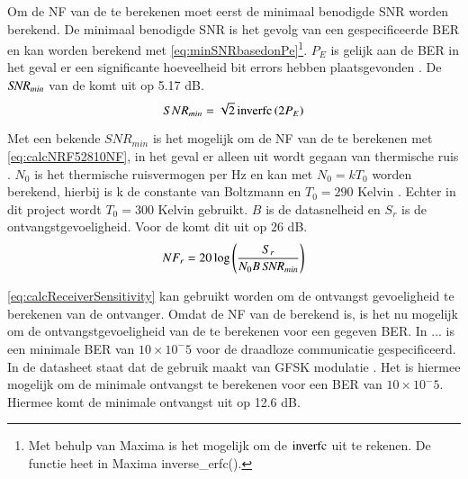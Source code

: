 Om de NF van de \mcu te berekenen moet eerst de minimaal benodigde SNR worden berekend. De minimaal benodigde SNR is het gevolg van een gespecificeerde BER en kan worden berekend met \autoref{eq:minSNRbasedonPe}\footnote{Met behulp van Maxima is het mogelijk om de $\operatorname{inverfc}$  uit te rekenen. De functie heet in Maxima inverse\_erfc().}. $P_E$ is gelijk aan de BER in het geval er een significante hoeveelheid bit errors hebben plaatsgevonden \cite{BERtoPe}. De $\mbox{\textit{SNR}}_{min}$ van de \mcu komt uit op 5.17 dB. 
\begin{equation}\label{eq:minSNRbasedonPe}
    SNR_{min}=\sqrt{2}\inverfc\left(2P_E\right)
    \tagaddtext{[\si{\decibel}]}
\end{equation}

Met een bekende $SNR_{min}$ is het mogelijk om de NF van de \mcu te berekenen met \autoref{eq:calcNRF52810NF}, in het geval er alleen uit wordt gegaan van thermische ruis \cite{SWRA030}. $N_0$ is het thermische ruisvermogen per Hz en kan met $N_0=kT_0$ worden berekend, hierbij is k de constante van Boltzmann en $T_0=290$ Kelvin \cite{Short-rangeWirelessCommunication}. Echter in dit project wordt $T_0=300$ Kelvin gebruikt. $B$ is de datasnelheid en $S_r$ is de ontvangstgevoeligheid. Voor de \mcu komt dit uit op 26 dB.
\begin{equation}\label{eq:calcNRF52810NF}
    NF_r=20\log\left(\frac{S_{r}}{N_0B\,\SNR_{min}}\right)
    \tagaddtext{[\si{\decibel}]}
\end{equation}

\autoref{eq:calcReceiverSensitivity} kan gebruikt worden om de ontvangst gevoeligheid te berekenen van de ontvanger. Omdat de NF van de \mcu berekend is, is het nu mogelijk om de ontvangstgevoeligheid van de \mcu te berekenen voor een gegeven BER. In ... is een minimale BER van $10\times10^-5$ voor de draadloze communicatie gespecificeerd. In de datasheet staat dat de \mcu gebruik maakt van GFSK modulatie \cite{dsNrf52810}. Het is hiermee mogelijk om de minimale ontvangst \SNR te berekenen voor een BER van $10\times10^-5$. Hiermee komt de minimale ontvangst \SNR uit op 12.6 dB.

